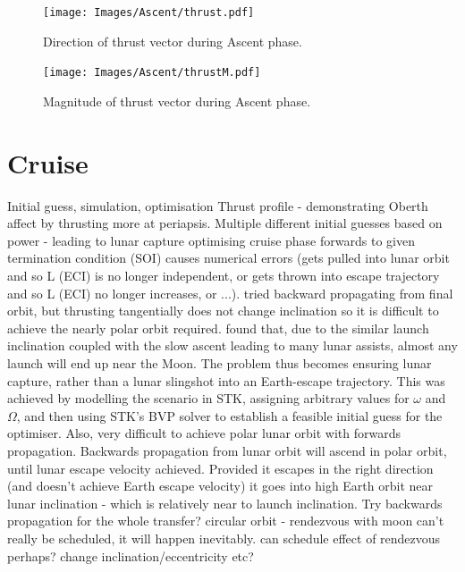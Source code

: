 \begin{figure}
\begin{center}
\texttt{[image: Images/Ascent/thrust.pdf]}
\end{center}
\caption{Direction of thrust vector during Ascent phase.}
\label{fig:Ascent-thrust}
\end{figure}

\begin{figure}
\begin{center}
\texttt{[image: Images/Ascent/thrustM.pdf]}
\end{center}
\caption{Magnitude of thrust vector during Ascent phase.}
\label{fig:Ascent-thrustM}
\end{figure}


\clearpage

\section{Cruise}
Initial guess, simulation, optimisation
Thrust profile - demonstrating Oberth affect by thrusting more at periapsis.
Multiple different initial guesses based on power - leading to lunar capture
optimising cruise phase forwards to given termination condition (SOI) causes numerical errors (gets pulled into lunar orbit and so L (ECI) is no longer independent, or gets thrown into escape trajectory and so L (ECI) no longer increases, or ...).
tried backward propagating from final orbit, but thrusting tangentially does not change inclination so it is difficult to achieve the nearly polar orbit required.
found that, due to the similar launch inclination coupled with the slow ascent leading to many lunar assists, almost any launch will end up near the Moon. The problem thus becomes ensuring lunar capture, rather than a lunar slingshot into an Earth-escape trajectory. This was achieved by modelling the scenario in STK, assigning arbitrary values for $\omega$ and $\Omega$, and then using STK's BVP solver to establish a feasible initial guess for the optimiser. 
Also, very difficult to achieve polar lunar orbit with forwards propagation. Backwards propagation from lunar orbit will ascend in polar orbit, until lunar escape velocity achieved. Provided it escapes in the right direction (and doesn't achieve Earth escape velocity) it goes into high Earth orbit near lunar inclination - which is relatively near to launch inclination. Try backwards propagation for the whole transfer?
circular orbit - rendezvous with moon can't really be scheduled, it will happen inevitably. can schedule effect of rendezvous perhaps? change inclination/eccentricity etc?

